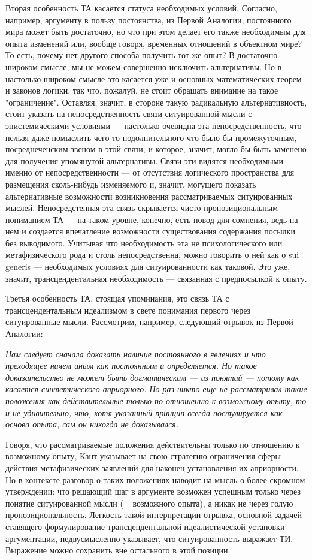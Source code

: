 \documentclass{article}
\begin{document}
Вторая особенность ТА касается статуса необходимых условий. Согласно, например, аргументу в пользу постоянства, из Первой Аналогии, постоянного мира может быть достаточно, но что при этом делает его также необходимым для опыта изменений или, вообще говоря, временных отношений в объектном мире? То есть, почему нет другого способа получить тот же опыт? В достаточно широком смысле, мы не можем совершенно исключить альтернативы. Но в настолько широком смысле это касается уже и основных математических теорем и законов логики, так что, пожалуй, не стоит обращать внимание на такое "ограничение". Оставляя, значит, в стороне такую радикальную альтернативность, стоит указать на непосредственность связи ситуированной мысли с эпистемическими условиями — настолько очевидна эта непосредственность, что нельзя даже помыслить чего-то подолнительного что было бы промежуточным, посреднеченским звеном в этой связи, и которое, значит, могло бы быть заменено для получения упомянутой альтернативы. Связи эти видятся необходимыми именно от непосредственности — от отсутствия логического пространства для размещения сколь-нибудь изменяемого и, значит, могущего показать альтернативные возможности возникновения рассматриваемых ситуированных мыслей. Непосредстенная эта связь скрывается чисто пропозициональным пониманием ТА — на таком уровне, конечно, есть повод для сомнения, ведь на нем и создается впечатление возможности существования содержания посылки без выводимого. Учитывая что необходимость эта не психологического или метафизического рода и столь непосредственна, можно говорить о ней как о sui generis — необходимых условиях для ситуированности как таковой. Это уже, значит, трансцендентальная необходимость — связанная с предпосылкой к опыту.

Третья особенность ТА, стоящая упоминания, это связь ТА с трансцендентальным идеализмом в свете понимания первого через ситуированные мысли. Рассмотрим, например, следующий отрывок из Первой Аналогии:

\textit{Нам следует сначала доказать наличие постоянного в явлениях и что преходящее ничем иным как постоянным и определяется. Но такое доказательство не может быть догматическим — из понятий — потому как касается синтетического априорного. Но раз никто еще не рассматривал такие положения как действительные только по отношению к возможному опыту, то и не удивительно, что, хотя указанный принцип всегда постулируется как основа опыта, сам он никогда не доказывался.}

Говоря, что рассматриваемые положения действительны только по отношению к возможному опыту, Кант указывает на свою стратегию ограничения сферы действия метафизических заявлений для наконец установления их априорности. Но в контексте разговор о таких положениях наводит на мысль о более скромном утверждении: что решающий шаг в аргументе возможен успешным только через понятие ситуированной мысли (= возможного опыта), а никак не через голую пропозициональность. Легкость такой интерпретации отрывка, основной задачей ставящего формулирование трансцендентальной идеалистической установки аргументации, недвусмысленно указывает, что ситуированность выражает ТИ. Выражение можно сохранить вне остального в этой позиции.
\end{document}
